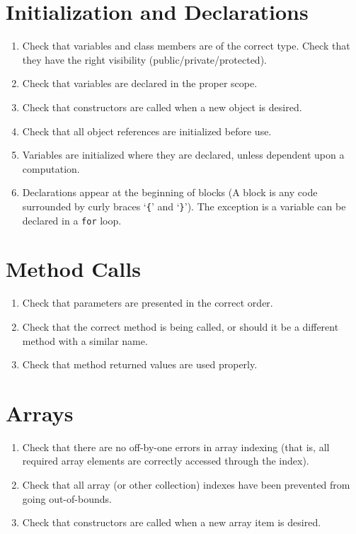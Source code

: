 \section{Initialization and Declarations}\begin{enumerate}[resume]
\item \label{item:X}Check that variables and class members are of the correct type. Check that they have the right visibility (public/private/protected).
\item \label{item:X}Check that variables are declared in the proper scope.
\item \label{item:X}Check that constructors are called when a new object is desired.
\item \label{item:X}Check that all object references are initialized before use.
\item \label{item:X}Variables are initialized where they are declared, unless dependent upon a computation.
\item \label{item:X}Declarations appear at the beginning of blocks (A block is any code surrounded by curly braces `\texttt{\{}' and `\texttt{\}}'). The exception is a variable can be declared in a \texttt{for} loop.
\end{enumerate}

\section{Method Calls}\begin{enumerate}[resume]
\item \label{item:X}Check that parameters are presented in the correct order.
\item \label{item:X}Check that the correct method is being called, or should it be a different method with a similar name.
\item \label{item:X}Check that method returned values are used properly.
\end{enumerate}

\section{Arrays}\begin{enumerate}[resume]
\item \label{item:X}Check that there are no off-by-one errors in array indexing (that is, all required array elements are correctly accessed through the index).
\item \label{item:X}Check that all array (or other collection) indexes have been prevented from going out-of-bounds.
\item \label{item:X}Check that constructors are called when a new array item is desired.
\end{enumerate}

